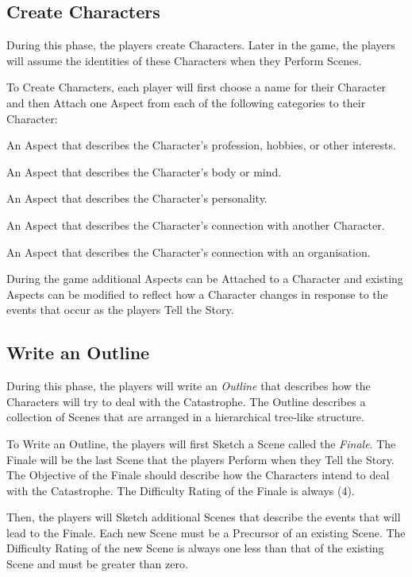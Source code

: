 \documentclass[12pt, a5paper, parskip=half-]{scrartcl}
\begin{document}
\newpage

\subsection*{Create Characters}
During this phase, the players create Characters.
Later in the game, the players will assume the identities of these Characters when they Perform Scenes.

To Create Characters, each player will first choose a name for their Character and then Attach one Aspect from each of the following categories to their Character:
\begin{description}[leftmargin=0pt]
   \item[Occupation]
     An Aspect that describes the Character's profession, hobbies, or other interests.
   \item[Physical or Mental Characteristic]
     An Aspect that describes the Character's body or mind.
   \item[Psychological Characteristic]
     An Aspect that describes the Character's personality.
   \item[Relationship]
     An Aspect that describes the Character's connection with another Character.
   \item[Affiliation]
     An Aspect that describes the Character's connection with an organisation.
\end{description}
During the game additional Aspects can be Attached to a Character and existing Aspects can be modified to reflect how a Character changes in response to the events that occur as the players Tell the Story.

\newpage

\subsection*{Write an Outline}
During this phase, the players will write an \emph{Outline} that describes how the Characters will try to deal with the Catastrophe.
The Outline describes a collection of Scenes that are arranged in a hierarchical tree-like structure.

To Write an Outline, the players will first Sketch a Scene called the \emph{Finale}.
The Finale will be the last Scene that the players Perform when they Tell the Story.
The Objective of the Finale should describe how the Characters intend to deal with the Catastrophe.
The Difficulty Rating of the Finale is always (4).

Then, the players will Sketch additional Scenes that describe the events that will lead to the Finale.
Each new Scene must be a Precursor of an existing Scene.
The Difficulty Rating of the new Scene is always one less than that of the existing Scene and must be greater than zero.
\end{document}
